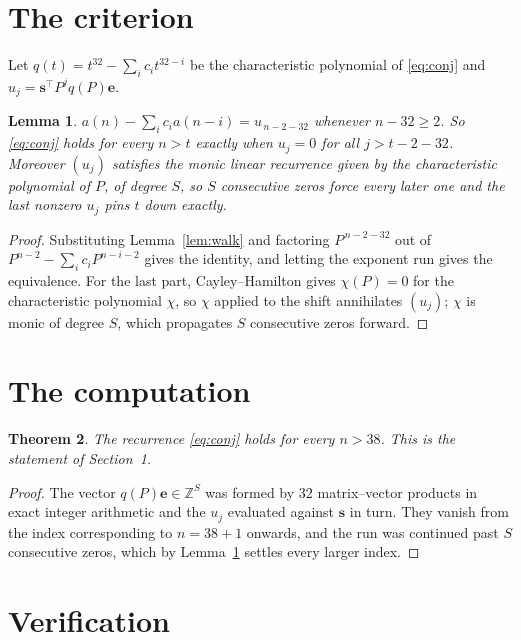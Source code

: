 \documentclass[11pt,a4paper]{article}
\theoremstyle{plain}
\newtheorem{theorem}{Theorem}
\newtheorem{lemma}[theorem]{Lemma}
\theoremstyle{definition}
\begin{document}
\section{The criterion}

Let $q(t)=t^{32}-\sum_i c_i t^{32-i}$ be the characteristic polynomial of
\eqref{eq:conj} and $u_j=\mathbf{s}^{\!\top}P^{j}q(P)\mathbf{e}$.

\begin{lemma}\label{lem:crit}
$a(n)-\sum_i c_i a(n-i)=u_{\,n-2-32}$ whenever $n-32\ge2$. So \eqref{eq:conj}
holds for every $n>t$ exactly when $u_j=0$ for all $j>t-2-32$. Moreover $(u_j)$
satisfies the monic linear recurrence given by the characteristic polynomial of $P$, of
degree $S$, so $S$ consecutive zeros force every later one and the last nonzero $u_j$ pins
$t$ down exactly.
\end{lemma}

\begin{proof}
Substituting Lemma~\ref{lem:walk} and factoring $P^{\,n-2-32}$ out of
$P^{n-2}-\sum_i c_i P^{n-i-2}$ gives the identity, and letting the exponent run gives the
equivalence. For the last part, Cayley--Hamilton gives $\chi(P)=0$ for the characteristic
polynomial $\chi$, so $\chi$ applied to the shift annihilates $(u_j)$; $\chi$ is monic of
degree $S$, which propagates $S$ consecutive zeros forward.
\end{proof}

\section{The computation}

\begin{theorem}
The recurrence \eqref{eq:conj} holds for every $n>38$. This is the statement of
Section~1.
\end{theorem}

\begin{proof}
The vector $q(P)\mathbf{e}\in\mathbb{Z}^{S}$ was formed by $32$ matrix--vector
products in exact integer arithmetic and the $u_j$ evaluated against $\mathbf{s}$ in turn.
They vanish from the index corresponding to $n=38+1$ onwards, and the run was continued
past $S$ consecutive zeros, which by Lemma~\ref{lem:crit} settles every larger index.
\end{proof}

\section{Verification}
\end{document}
